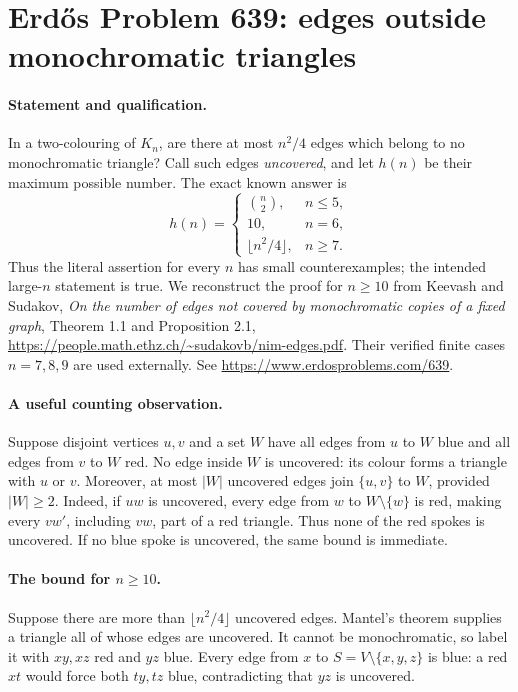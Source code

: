 \section*{Erd\H{o}s Problem 639: edges outside monochromatic triangles}

\paragraph{Statement and qualification.}
In a two-colouring of \(K_n\), are there at most \(n^2/4\) edges
which belong to no monochromatic triangle?
Call such edges \emph{uncovered}, and let \(h(n)\) be their maximum
possible number. The exact known answer is
\[
 h(n)=
 \begin{cases}
 \binom n2,&n\leq5,\\
 10,&n=6,\\
 \lfloor n^2/4\rfloor,&n\geq7.
 \end{cases}
\]
Thus the literal assertion for every \(n\) has small counterexamples;
the intended large-\(n\) statement is true.
We reconstruct the proof for \(n\geq10\) from Keevash and Sudakov,
\emph{On the number of edges not covered by monochromatic copies of
a fixed graph}, Theorem 1.1 and Proposition 2.1,
\url{https://people.math.ethz.ch/~sudakovb/nim-edges.pdf}.
Their verified finite cases \(n=7,8,9\) are used externally.
See \url{https://www.erdosproblems.com/639}.

\paragraph{A useful counting observation.}
Suppose disjoint vertices \(u,v\) and a set \(W\) have all edges
from \(u\) to \(W\) blue and all edges from \(v\) to \(W\) red.
No edge inside \(W\) is uncovered: its colour forms a triangle
with \(u\) or \(v\).
Moreover, at most \(|W|\) uncovered edges join \(\{u,v\}\) to \(W\),
provided \(|W|\geq2\).
Indeed, if \(uw\) is uncovered, every edge from \(w\) to
\(W\setminus\{w\}\) is red, making every \(vw'\), including \(vw\),
part of a red triangle. Thus none of the red spokes is uncovered.
If no blue spoke is uncovered, the same bound is immediate.

\paragraph{The bound for \(n\geq10\).}
Suppose there are more than \(\lfloor n^2/4\rfloor\) uncovered edges.
Mantel's theorem supplies a triangle all of whose edges are uncovered.
It cannot be monochromatic, so label it with \(xy,xz\) red and
\(yz\) blue. Every edge from \(x\) to
\(S=V\setminus\{x,y,z\}\) is blue: a red \(xt\) would force
both \(ty,tz\) blue, contradicting that \(yz\) is uncovered.

